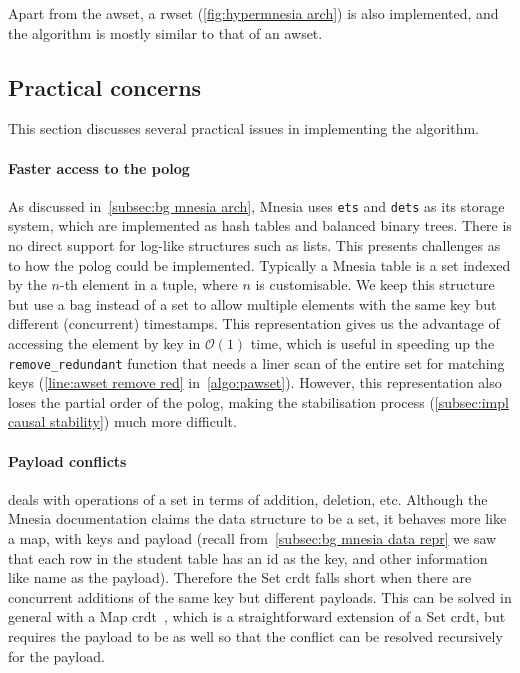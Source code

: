 Apart from the \acrlong{awset}, a \acrlong{rwset} (\cref{fig:hypermnesia arch}) 
is also implemented, and the algorithm is mostly similar to that of an \acrlong{awset}.

\subsection{Practical concerns} \label{subsec:impl practical}

This section discusses several practical issues in implementing the algorithm.

\paragraph{Faster access to the \acrshort{polog}}

As discussed in~\cref{subsec:bg mnesia arch}, Mnesia uses \texttt{ets} and \texttt{dets}
as its storage system, which are implemented as hash tables and balanced binary trees.
There is no direct support for log-like structures such as lists. This
presents challenges as to how the \acrshort{polog} could be implemented. Typically
a Mnesia table is a set indexed by the \(n\)-th element in a tuple, where \(n\) 
is customisable. We keep this structure but use a bag instead of a set to allow
multiple elements with the same key but different (concurrent) timestamps. 
This representation gives us the advantage of accessing the element by key 
in \(\mathcal O(1)\) time, which is useful in speeding
up the \verb|remove_redundant| function that needs a liner scan of the entire set
for matching keys (\cref{line:awset remove red} in~\cref{algo:pawset}).
However, this representation also loses the partial order of the
\acrshort{polog}, making the stabilisation process (\cref{subsec:impl causal stability}) 
much more difficult. 


\paragraph{Payload conflicts}

 deals with operations of a set in terms of addition, deletion,
etc. Although the Mnesia documentation claims the data structure to be a set,
it behaves more like a map, with keys and payload 
(recall from~\cref{subsec:bg mnesia data repr} we saw that each row in the student 
table has an id as the key, and other information like name as the payload). 
Therefore the Set \acrshort{crdt}
falls short when there are concurrent additions of the same key but different
payloads. This can be solved in general with a Map \acrshort{crdt}~\cite{shapiro2011CRDT}, 
which is a straightforward extension of a Set \acrshort{crdt}, but requires the
payload to be  as well so that the conflict can be resolved
recursively for the payload.


